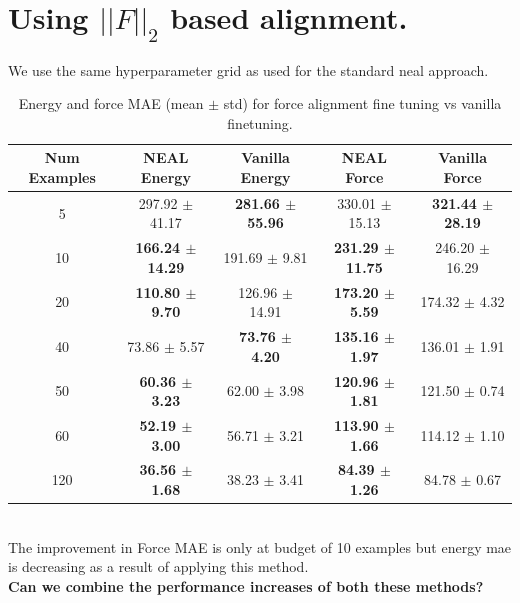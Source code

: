 \documentclass[12pt]{article}
\theoremstyle{definition}
\theoremstyle{remark}
\begin{document}
\section{Using $||F||_2$ based alignment.}
We use the same hyperparameter grid as used for the standard neal approach.
\begin{table}[h!]
\centering
\begin{tabular}{c|cc|cc}
\hline
\textbf{Num Examples} &
\textbf{NEAL Energy} & \textbf{Vanilla Energy} &
\textbf{NEAL Force} & \textbf{Vanilla Force} \\
\hline

5  &
297.92 $\pm$ 41.17 &
\textbf{281.66 $\pm$ 55.96} &
330.01 $\pm$ 15.13 &
\textbf{321.44 $\pm$ 28.19} \\

10 &
\textbf{166.24 $\pm$ 14.29} &
191.69 $\pm$ 9.81 &
\textbf{231.29 $\pm$ 11.75} &
246.20 $\pm$ 16.29 \\

20 &
\textbf{110.80 $\pm$ 9.70} &
126.96 $\pm$ 14.91 &
\textbf{173.20 $\pm$ 5.59} &
174.32 $\pm$ 4.32 \\

40 &
73.86 $\pm$ 5.57 &
\textbf{73.76 $\pm$ 4.20} &
\textbf{135.16 $\pm$ 1.97} &
136.01 $\pm$ 1.91 \\

50 &
\textbf{60.36 $\pm$ 3.23} &
62.00 $\pm$ 3.98 &
\textbf{120.96 $\pm$ 1.81} &
121.50 $\pm$ 0.74 \\

60 &
\textbf{52.19 $\pm$ 3.00} &
56.71 $\pm$ 3.21 &
\textbf{113.90 $\pm$ 1.66} &
114.12 $\pm$ 1.10 \\

120 &
\textbf{36.56 $\pm$ 1.68} &
38.23 $\pm$ 3.41 &
\textbf{84.39 $\pm$ 1.26} &
84.78 $\pm$ 0.67 \\
\hline
\end{tabular}
\caption{Energy and force MAE (mean $\pm$ std) for force alignment fine tuning vs vanilla finetuning.}
\end{table}
\\
The improvement in Force MAE is only at budget of 10 examples but energy mae is decreasing as a result of applying this method. 
\\
\textbf{Can we combine the performance increases of both these methods?}

\newpage
\end{document}
